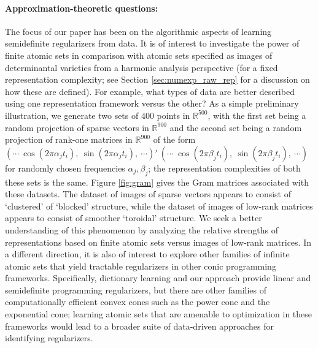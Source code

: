 \documentclass[11pt,letterpaper]{article}
\newcommand{\R}{\mathbb{R}}
\begin{document}
\paragraph{Approximation-theoretic questions:} The focus of our paper has been on the algorithmic aspects of learning semidefinite regularizers from data.  It is of interest to investigate the power of finite atomic sets in comparison with atomic sets specified as images of determinantal varieties from a harmonic analysis perspective (for a fixed representation complexity; see Section \ref{sec:numexp_raw_rep} for a discussion on how these are defined).  For example, what types of data are better described using one representation framework versus the other?  As a simple preliminary illustration, we generate two sets of $400$ points in $\R^{500}$, with the first set being a random projection of sparse vectors in $\R^{900}$ and the second set being a random projection of rank-one matrices in $\R^{900}$ of the form $( \cdots ~ \cos(2 \pi \alpha_j t_i), ~ \sin(2 \pi \alpha_j t_i), ~ \cdots)' ~ ( \cdots ~ \cos(2 \pi \beta_j t_i), ~ \sin(2 \pi \beta_j t_i), ~ \cdots)$ for randomly chosen frequencies $\alpha_j, \beta_j$; the representation complexities of both these sets is the same.  Figure \ref{fig:gram} gives the Gram matrices associated with these datasets.  The dataset of images of sparse vectors appears to consist of `clustered' of `blocked' structure, while the dataset of images of low-rank matrices appears to consist of smoother `toroidal' structure.  We seek a better understanding of this phenomenon by analyzing the relative strengths of representations based on finite atomic sets versus images of low-rank matrices.  In a different direction, it is also of interest to explore other families of infinite atomic sets that yield tractable regularizers in other conic programming frameworks.  Specifically, dictionary learning and our approach provide linear and semidefinite programming regularizers, but there are other families of computationally efficient convex cones such as the power cone and the exponential cone; learning atomic sets that are amenable to optimization in these frameworks would lead to a broader suite of data-driven approaches for identifying regularizers.


%
%
\end{document}
